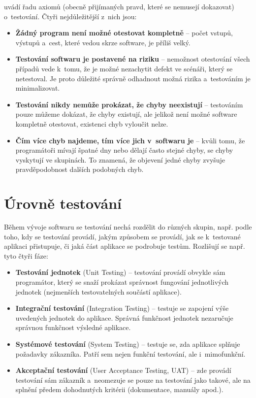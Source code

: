 	\citep{Patton} uvádí řadu axiomů (obecně přijímaných pravd, které se nemusejí dokazovat) o~testování. Čtyři nejdůležitější z~nich jsou:
		\begin{itemize}
			\item \textbf{Žádný program není možné otestovat kompletně} -- počet vstupů, výstupů a~cest, které vedou skrze software, je příliš velký.
			\item \textbf{Testování softwaru je postavené na riziku} -- nemožnost otestování všech případů vede k~tomu, že je možné nezachytit defekt ve scénáři, který se netestoval. Je proto důležité správně odhadnout možná rizika a~testováním je minimalizovat.
			\item \textbf{Testování nikdy nemůže prokázat, že chyby neexistují} -- testováním pouze můžeme dokázat, že chyby existují, ale jelikož není možné software kompletně otestovat, existenci chyb vyloučit nelze.
			\item \textbf{Čím více chyb najdeme, tím více jich v~softwaru je} -- kvůli tomu, že programátoři mívají špatné dny nebo dělají často stejné chyby, se chyby vyskytují ve skupinách. To znamená, že objevení jedné chyby zvyšuje pravděpodobnost dalších podobných chyb.
		\end{itemize}
		
		\section{Úrovně testování}
		Během vývoje softwaru se testování nechá rozdělit do různých skupin, např. podle toho, kdy se testování provádí, jakým způsobem se provádí, jak se k~testované aplikaci přistupuje, či jaká část aplikace se podrobuje testům. Rozlišují se např. tyto čtyři fáze:
			\begin{itemize}
				\item \textbf{Testování jednotek} (Unit Testing) -- testování provádí obvykle sám programátor, který se snaží prokázat správnost fungování jednotlivých jednotek (nejmenších testovatelných součástí aplikace).
				\item \textbf{Integrační testování} (Integration Testing) -- testuje se zapojení výše uvedených jednotek do aplikace. Správná funkčnost jednotek nezaručuje správnou funkčnost výsledné aplikace.
				\item \textbf{Systémové testování} (System Testing) -- testuje se, zda aplikace splňuje požadavky zákazníka. Patří sem nejen funkční testování, ale i~mimofunkční.
				\item \textbf{Akceptační testování} (User Acceptance Testing, UAT) -- zde provádí testování sám zákazník a~neomezuje se pouze na testování jako takové, ale na splnění předem dohodnutých kritérii (dokumentace, manuály apod.).
			\end{itemize}
			
